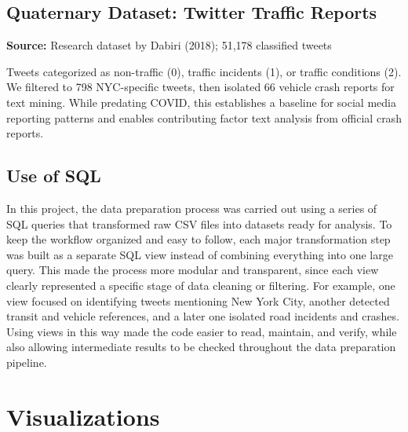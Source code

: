 \documentclass[10pt]{article}\usepackage[]{graphicx}\usepackage[]{xcolor}
\begin{document}
\subsection{Quaternary Dataset: Twitter Traffic Reports}
\textbf{Source:} Research dataset by Dabiri (2018); 51,178 classified tweets

Tweets categorized as non-traffic (0), traffic incidents (1), or traffic conditions (2). We filtered to 798 NYC-specific tweets, then isolated 66 vehicle crash reports for text mining. While predating COVID, this establishes a baseline for social media reporting patterns and enables contributing factor text analysis from official crash reports.

\subsection{Use of SQL}

In this project, the data preparation process was carried out using a series of SQL queries that transformed raw CSV files into datasets ready for analysis. To keep the workflow organized and easy to follow, each major transformation step was built as a separate SQL view instead of combining everything into one large query. This made the process more modular and transparent, since each view clearly represented a specific stage of data cleaning or filtering. For example, one view focused on identifying tweets mentioning New York City, another detected transit and vehicle references, and a later one isolated road incidents and crashes. Using views in this way made the code easier to read, maintain, and verify, while also allowing intermediate results to be checked throughout the data preparation pipeline.


\newpage












\section{Visualizations}
\end{document}
